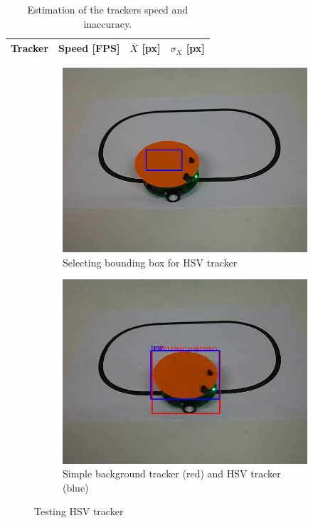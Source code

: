 \begin{table}
\centering
\begin{tabular}{l|r|r|r}
Tracker	& Speed [FPS] & $\bar{X}$ [px] & $\sigma_X$ [px] \\
\hline

\end{tabular}
\caption{Estimation of the trackers speed and inaccuracy.}
\label{table:experiment-robot}
\end{table}

\begin{figure}
\centering
\begin{subfigure}{0.48\linewidth}
\includegraphics[width=\linewidth]{img/experiments/hsv-select.png}
\caption{Selecting bounding box for HSV tracker}
\label{fig:hsv-bbox}
\end{subfigure}
\begin{subfigure}{0.48\linewidth}
\includegraphics[width=\linewidth]{img/experiments/hsv-tracking.png}
\caption{Simple background tracker (red) and HSV tracker (blue)}
\label{fig:hsv-diff}
\end{subfigure}
\caption{Testing HSV tracker}
\end{figure}

